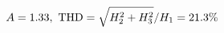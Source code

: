 \documentclass[preview]{standalone}
\begin{document}
\begin{align*}
\special{dvisvgm:raw <g id='unique000'>}A=1.33,\ \text{THD}=\sqrt{H_2^2+H_3^2}/H_1=21.3\%\special{dvisvgm:raw </g>}
\end{align*}
\end{document}
